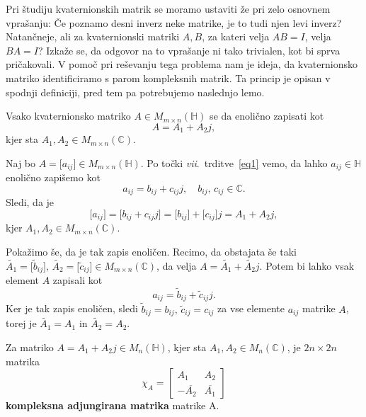 \documentclass[mat1, tisk]{fmfdelo}
\numberwithin{equation}{section}
\begin{document}
Pri študiju kvaternionskih matrik se moramo ustaviti že pri zelo osnovnem vprašanju: Če poznamo desni inverz neke matrike, je to tudi njen levi inverz? 
Natančneje, ali za kvaternionski matriki $A, B$, za kateri velja $AB = I$, velja $BA = I$? Izkaže se, da odgovor na to vprašanje 
ni tako trivialen, kot bi sprva pričakovali. V pomoč pri reševanju tega problema nam je ideja, da kvaternionsko matriko
identificiramo s parom kompleksnih matrik. Ta princip je opisan v spodnji definiciji, pred tem pa potrebujemo naslednjo lemo.

\begin{lema}\label{razcep}
    Vsako kvaternionsko matriko $A \in M_{m \times n}(\mathbb{H})$ se da enolično zapisati kot 
    $$A = A_{1} + A_{2}j,$$
    kjer sta $A_{1}, A_{2} \in M_{m \times n}(\mathbb{C})$.
\end{lema}

\begin{dokaz}
    Naj bo $A = \big[a_{ij}\big] \in M_{m \times n}(\mathbb{H})$. Po točki \textit{vii}.\ trditve~\ref{eq1} vemo, da lahko $a_{ij} \in \mathbb{H}$ enolično zapišemo kot 
    $$a_{ij} = b_{ij} + c_{ij}j, \quad b_{ij}, \, c_{ij} \in \mathbb{C}.$$
    Sledi, da je
    $$\big[a_{ij}\big] = \big[b_{ij} + c_{ij}j\big] 
    = \big[b_{ij}\big] + \big[c_{ij}\big]j 
    = A_{1} + A_{2}j,$$
    kjer $A_{1}, A_{2} \in M_{m \times n}(\mathbb{C})$. 
    
    \medskip
    Pokažimo še, da je tak zapis enoličen. Recimo, da obstajata še taki $\tilde{A_{1}} = \big[\tilde{b}_{ij}\big], \, \tilde{A_{2}} = \big[\tilde{c}_{ij}\big] \in M_{m \times n}(\mathbb{C})$, 
    da velja $A = \tilde{A_{1}} + \tilde{A_{2}}j$. Potem bi lahko vsak element $A$ zapisali kot
    \[ a_{ij} = \tilde{b}_{ij} + \tilde{c}_{ij}j. \]
    Ker je tak zapis enoličen, sledi $\tilde{b}_{ij} = b_{ij}, \, \tilde{c}_{ij} = c_{ij}$
    za vse elemente $a_{ij}$ matrike $A$, torej je $\tilde{A_{1}} = A_{1}$ in $\tilde{A_{2}} = A_{2}$.
\end{dokaz}

\begin{definicija}
    Za matriko $A = A_{1} + A_{2}j \in M_{n} (\mathbb{H})$, kjer sta $A_{1}, A_{2} \in M_{n} (\mathbb{C})$, je $2n \times 2n$ matrika 
        $$\chi_{A} = 
        \begin{bmatrix}
            A_{1} & A_{2}\\
            - \overline{A_2} & \overline{A_1}
        \end{bmatrix} $$
        \textbf{kompleksna adjungirana matrika} matrike A.
\end{definicija}
\end{document}
